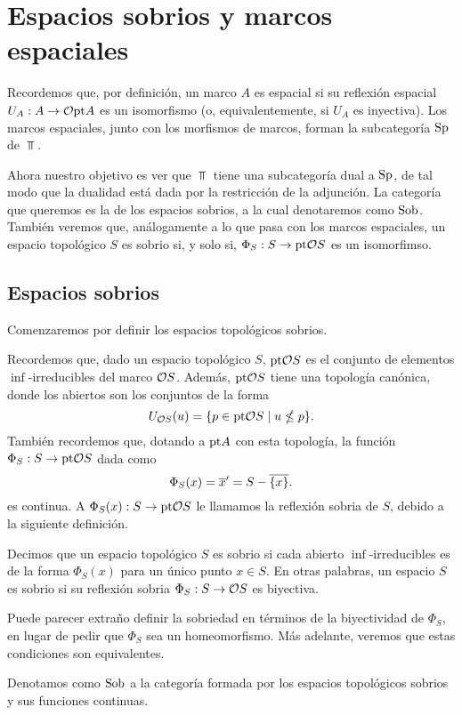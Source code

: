 \chapter{Espacios sobrios y marcos espaciales}

Recordemos que, por definición, un marco $A$ es espacial si
su reflexión espacial $U_A:A\to\cal O\pt A$ es un isomorfismo
(o, equivalentemente, si $U_A$ es inyectiva).
Los marcos espaciales, junto con los morfismos de marcos,
forman la subcategoría $\Sp$ de $\Top$.

Ahora nuestro objetivo es ver que $\Top$ tiene una subcategoría
dual a $\Sp$, de tal modo que la dualidad
está dada por la restricción de la adjunción.
La categoría que queremos es la de los espacios sobrios,
a la cual denotaremos como $\Sob$.
También veremos que, análogamente a lo que pasa
con los marcos espaciales, un espacio topológico $S$ es sobrio
si, y solo si, $\Phi_S:S\to\pt\cal OS$ es un isomorfimso.

\section{Espacios sobrios}
Comenzaremos por definir los espacios topológicos sobrios.

Recordemos que, dado un espacio topológico $S$,
$\pt\cal OS$ es el conjunto de elementos
$\inf$-irreducibles del marco $\cal OS$.
Además, $\pt\cal OS$ tiene una topología canónica,
donde los abiertos son los conjuntos de la forma
\[
    U_{\cal OS}(u) = \{p\in\pt\cal OS \mid u\nleq p\}
.\]
También recordemos que, dotando a $\pt A$ con esta topología,
la función $\Phi_S:S\to\pt\cal OS$ dada como
\[
    \Phi_S(x) = \ol{x}' = S-\ol{\{x\}}.
\]
es continua.
A $\Phi_S(x):S\to\pt\cal OS$ le llamamos
la reflexión sobria de $S$, debido a la siguiente definición.

\begin{defn}
    Decimos que un espacio topológico $S$ es sobrio si
    cada abierto $\inf$-irreducibles es de la forma
    $\Phi_S(x)$ para un único punto $x\in S$.
    En otras palabras, un espacio $S$ es sobrio
    si su reflexión sobria $\Phi_S:S\to\cal OS$ es biyectiva.
    
    Puede parecer extraño definir la sobriedad en términos de
    la biyectividad de $\Phi_S$, en lugar de pedir que $\Phi_S$
    sea un homeomorfismo.
    Más adelante, veremos que estas condiciones son equivalentes.
    
    Denotamos como $\Sob$ a la categoría formada por
    los espacios topológicos sobrios y sus funciones continuas.
\end{defn}

